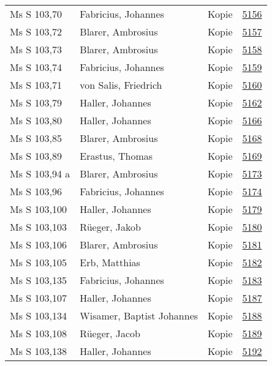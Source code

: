 \documentclass[10pt,a4paper,landscape]{report}
\begin{document}
\begin{longtable}{p{16cm}p{4cm}lr}
Ms S 103,70	&	Fabricius, Johannes	&	Kopie	&	\href{http://130.60.24.72/assignment/5156}{5156}\\
Ms S 103,72	&	Blarer, Ambrosius	&	Kopie	&	\href{http://130.60.24.72/assignment/5157}{5157}\\
Ms S 103,73	&	Blarer, Ambrosius	&	Kopie	&	\href{http://130.60.24.72/assignment/5158}{5158}\\
Ms S 103,74	&	Fabricius, Johannes	&	Kopie	&	\href{http://130.60.24.72/assignment/5159}{5159}\\
Ms S 103,71	&	von Salis, Friedrich	&	Kopie	&	\href{http://130.60.24.72/assignment/5160}{5160}\\
Ms S 103,79	&	Haller, Johannes	&	Kopie	&	\href{http://130.60.24.72/assignment/5162}{5162}\\
Ms S 103,80	&	Haller, Johannes	&	Kopie	&	\href{http://130.60.24.72/assignment/5166}{5166}\\
Ms S 103,85	&	Blarer, Ambrosius	&	Kopie	&	\href{http://130.60.24.72/assignment/5168}{5168}\\
Ms S 103,89	&	Erastus, Thomas	&	Kopie	&	\href{http://130.60.24.72/assignment/5169}{5169}\\
Ms S 103,94 a	&	Blarer, Ambrosius	&	Kopie	&	\href{http://130.60.24.72/assignment/5173}{5173}\\
Ms S 103,96	&	Fabricius, Johannes	&	Kopie	&	\href{http://130.60.24.72/assignment/5174}{5174}\\
Ms S 103,100	&	Haller, Johannes	&	Kopie	&	\href{http://130.60.24.72/assignment/5179}{5179}\\
Ms S 103,103	&	Rüeger, Jakob	&	Kopie	&	\href{http://130.60.24.72/assignment/5180}{5180}\\
Ms S 103,106	&	Blarer, Ambrosius	&	Kopie	&	\href{http://130.60.24.72/assignment/5181}{5181}\\
Ms S 103,105	&	Erb, Matthias	&	Kopie	&	\href{http://130.60.24.72/assignment/5182}{5182}\\
Ms S 103,135	&	Fabricius, Johannes	&	Kopie	&	\href{http://130.60.24.72/assignment/5183}{5183}\\
Ms S 103,107	&	Haller, Johannes	&	Kopie	&	\href{http://130.60.24.72/assignment/5187}{5187}\\
Ms S 103,134	&	Wisamer, Baptist Johannes	&	Kopie	&	\href{http://130.60.24.72/assignment/5188}{5188}\\
Ms S 103,108	&	Rüeger, Jacob	&	Kopie	&	\href{http://130.60.24.72/assignment/5189}{5189}\\
Ms S 103,138	&	Haller, Johannes	&	Kopie	&	\href{http://130.60.24.72/assignment/5192}{5192}\\

\end{longtable}
\end{document}
